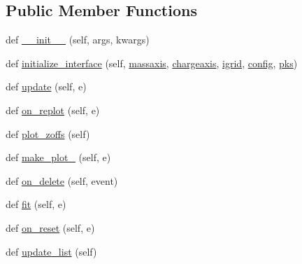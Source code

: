 \subsection*{Public Member Functions}
\begin{DoxyCompactItemize}
\item 
def \hyperlink{class_uni_dec_1_1unidec__modules_1_1nativez_1_1_native_z_aa3e2981ccdcb20f0741be6c40ec53435}{\+\_\+\+\_\+init\+\_\+\+\_\+} (self, args, kwargs)
\item 
def \hyperlink{class_uni_dec_1_1unidec__modules_1_1nativez_1_1_native_z_a14f588747a9be5a3ece7f15195762e58}{initialize\+\_\+interface} (self, \hyperlink{class_uni_dec_1_1unidec__modules_1_1nativez_1_1_native_z_aa1141b75aeb810afdb7e53603a4f6c82}{massaxis}, \hyperlink{class_uni_dec_1_1unidec__modules_1_1nativez_1_1_native_z_a1e4ae73b3205b32a6ec8abb9b837dff8}{chargeaxis}, \hyperlink{class_uni_dec_1_1unidec__modules_1_1nativez_1_1_native_z_a2af2834d84106f500243c40bed8b030c}{igrid}, \hyperlink{class_uni_dec_1_1unidec__modules_1_1nativez_1_1_native_z_af6a24d52d1c68060c9d7dfceeb7d05c0}{config}, \hyperlink{class_uni_dec_1_1unidec__modules_1_1nativez_1_1_native_z_a982aab89fde164965e26de746c80def1}{pks})
\item 
def \hyperlink{class_uni_dec_1_1unidec__modules_1_1nativez_1_1_native_z_acc3d1574a3e2be5d57eec7c832f7cabf}{update} (self, e)
\item 
def \hyperlink{class_uni_dec_1_1unidec__modules_1_1nativez_1_1_native_z_a1ec2f6836708ad016f6b7b2df3197199}{on\+\_\+replot} (self, e)
\item 
def \hyperlink{class_uni_dec_1_1unidec__modules_1_1nativez_1_1_native_z_ac592bcf1ceca05bd68b6dc80809d7e56}{plot\+\_\+zoffs} (self)
\item 
def \hyperlink{class_uni_dec_1_1unidec__modules_1_1nativez_1_1_native_z_a990c6eebaac97d3a27e10544e98ece9f}{make\+\_\+plot\+\_} (self, e)
\item 
def \hyperlink{class_uni_dec_1_1unidec__modules_1_1nativez_1_1_native_z_a7e29e559da193da4fadfeb0a2a0e06c0}{on\+\_\+delete} (self, event)
\item 
def \hyperlink{class_uni_dec_1_1unidec__modules_1_1nativez_1_1_native_z_a57ac5b495f5421601aa3817220ddb6b5}{fit} (self, e)
\item 
def \hyperlink{class_uni_dec_1_1unidec__modules_1_1nativez_1_1_native_z_a4ff55763b323e074d1db52f43a130c36}{on\+\_\+reset} (self, e)
\item 
def \hyperlink{class_uni_dec_1_1unidec__modules_1_1nativez_1_1_native_z_a38a3569a7fdf0244bc0f66b1be415ad2}{update\+\_\+list} (self)

\end{DoxyCompactItemize}
